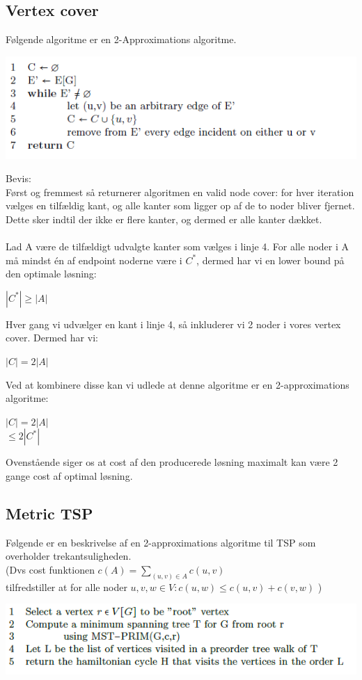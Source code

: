\documentclass{article}
\begin{document}
\subsection{Vertex cover}
Følgende algoritme er en 2-Approximations algoritme. 
\begin{center}
	\includegraphics[scale=0.7]{ApproxVertexCover}
\end{center}
Bevis:\\
Først og fremmest så returnerer algoritmen en valid node cover: for hver iteration vælges en tilfældig kant, og alle kanter som ligger op af de to noder bliver fjernet. Dette sker indtil der ikke er flere kanter, og dermed er alle kanter dækket.\\\\
Lad A være de tilfældigt udvalgte kanter som vælges i linje 4. For alle noder i A må mindst én af endpoint noderne være i $C^*$, dermed har vi en lower bound på den optimale løsning:
\begin{center}
	$|C^*| \ge |A|$
\end{center}
Hver gang vi udvælger en kant i linje 4, så inkluderer vi 2 noder i vores vertex cover. Dermed har vi:
\begin{center}
	$|C| = 2|A|$
\end{center}
Ved at kombinere disse kan vi udlede at denne algoritme er en 2-approximations algoritme:
\begin{center}
 	$|C| = 2|A|$
 	\\ \qquad  $\le 2|C^*|$
\end{center}
Ovenstående siger os at cost af den producerede løsning maximalt kan være 2 gange cost af optimal løsning.
\subsection{Metric TSP}
Følgende er en beskrivelse af en 2-approximations algoritme til TSP som overholder trekantsuligheden.\\ (Dvs cost funktionen $c(A) = \sum\limits_{(u,v)\in A } c(u,v)$\\ tilfredstiller at for alle noder $u,v,w \in V: c(u,w) \le c(u,v) + c(v,w)$ )\\
\begin{center}
	\includegraphics[scale=0.7]{tspApprox}
\end{center}
\end{document}
